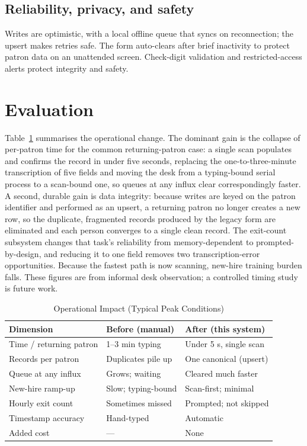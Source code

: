 \documentclass[conference]{IEEEtran}
\begin{document}
\subsection{Reliability, privacy, and safety}
Writes are optimistic, with a local offline queue that syncs on reconnection; the upsert makes retries safe. The form auto-clears after brief inactivity to protect patron data on an unattended screen. Check-digit validation and restricted-access alerts protect integrity and safety.

\section{Evaluation}
Table~\ref{tab:impact} summarises the operational change. The dominant gain is the collapse of per-patron time for the common returning-patron case: a single scan populates and confirms the record in under five seconds, replacing the one-to-three-minute transcription of five fields and moving the desk from a typing-bound serial process to a scan-bound one, so queues at any influx clear correspondingly faster. A second, durable gain is data integrity: because writes are keyed on the patron identifier and performed as an upsert, a returning patron no longer creates a new row, so the duplicate, fragmented records produced by the legacy form are eliminated and each person converges to a single clean record. The exit-count subsystem changes that task's reliability from memory-dependent to prompted-by-design, and reducing it to one field removes two transcription-error opportunities. Because the fastest path is now scanning, new-hire training burden falls. These figures are from informal desk observation; a controlled timing study is future work.

\begin{table}[t]
\caption{Operational Impact (Typical Peak Conditions)}
\label{tab:impact}
\centering
\begin{tabular}{p{2.1cm} p{2.4cm} p{2.6cm}}
\toprule
\textbf{Dimension} & \textbf{Before (manual)} & \textbf{After (this system)} \\
\midrule
Time / returning patron & 1--3 min typing & Under 5 s, single scan \\
Records per patron & Duplicates pile up & One canonical (upsert) \\
Queue at any influx & Grows; waiting & Cleared much faster \\
New-hire ramp-up & Slow; typing-bound & Scan-first; minimal \\
Hourly exit count & Sometimes missed & Prompted; not skipped \\
Timestamp accuracy & Hand-typed & Automatic \\
Added cost & --- & None \\
\bottomrule
\end{tabular}
\end{table}
\end{document}

